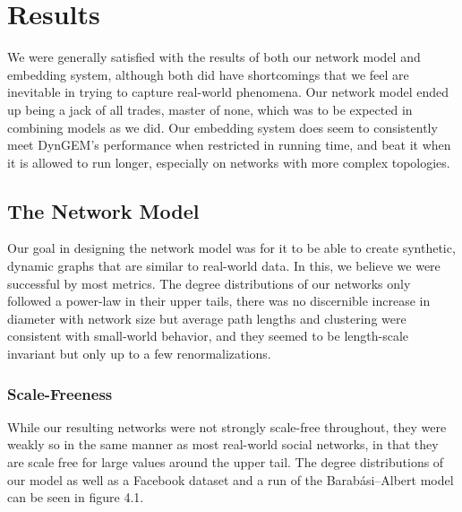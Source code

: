 \documentclass[12pt,twoside]{report}
\begin{document}
\chapter{Results}

We were generally satisfied with the results of both our network model and embedding system, although both did have shortcomings that we feel are inevitable in trying to capture real-world phenomena. Our network model ended up being a jack of all trades, master of none, which was to be expected in combining models as we did. Our embedding system does seem to consistently meet DynGEM's performance when restricted in running time, and beat it when it is allowed to run longer, especially on networks with more complex  topologies. \\ 

\section{The Network Model}

Our goal in designing the network model was for it to be able to create synthetic, dynamic graphs that are similar to real-world data. In this, we believe we were successful by most metrics. The degree distributions of our networks only followed a power-law in their upper tails, there was no discernible increase in diameter with network size but average path lengths and clustering were consistent with small-world behavior, and they seemed to be length-scale invariant but only up to a few renormalizations. \\

\subsection{Scale-Freeness}

While our resulting networks were not strongly scale-free throughout, they were weakly so in the same manner as most real-world social networks, in that they are scale free for large values around the upper tail. The degree distributions of our model as well as a Facebook dataset and a run of the Barabási–Albert model can be seen in figure 4.1. \\
\end{document}
